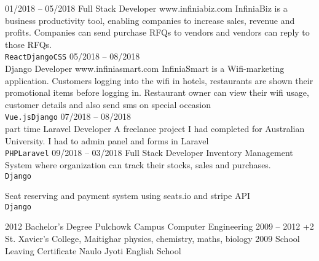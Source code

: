 \documentclass[9pt]{developercv} %
\begin{document}
\begin{entrylist}
	\entry
		{01/2018 -- 05/2018}
		{Full Stack Developer}
		{www.infiniabiz.com}
    		{
    InfiniaBiz is a business productivity tool, enabling companies to increase sales, revenue and profits. Companies can send purchase RFQs to vendors and vendors can reply to those RFQs.\\ 
    		    \texttt{React}\slashsep\texttt{Django}\slashsep\texttt{CSS}\slashsep{}}
	\entry
		{05/2018 -- 08/2018\\\footnotesize{}}
		{Django Developer}
		{www.infiniasmart.com}
		{
		    InfiniaSmart is a Wifi-marketing application. Customers logging into the wifi in hotels, restaurants are shown their promotional items before logging in. Restaurant owner can view their wifi usage, customer details and also send sms on special occasion\\
		    \texttt{Vue.js}\slashsep\texttt{Django}\slashsep{}
		}
	\entry
		{07/2018 -- 08/2018\\\footnotesize{part time}}
		{Laravel Developer}
		{}
		{
		   A freelance project I had completed for Australian University. I had to admin panel and forms in Laravel\\ \texttt{PHP}\slashsep\texttt{Laravel}
		}
	\entry
	    {09/2018 -- 03/2018}
	    {Full Stack Developer}
	    {}
	    {
	        Inventory Management System where organization can track their stocks, sales and purchases.\\
	        \texttt{Django}\slashsep{}\slashsep{}\slashsep{}
	    }
	    
	    {Seat reserving and payment system using seats.io and stripe API\\
	        \texttt{Django}\slashsep{}\slashsep{}\slashsep{}
	    }
\end{entrylist}



\begin{entrylist}
	\entry
		{2012}
		{Bachelor's Degree}
		{Pulchowk Campus}
	    {Computer Engineering}
	\entry
		{2009 -- 2012}
		{+2}
		{St. Xavier's College, Maitighar}
		{physics, chemistry, maths, biology}
	\entry
		{2009}
		{School Leaving Certificate}
		{Naulo Jyoti English School}
		{}
\end{entrylist}
\end{document}
